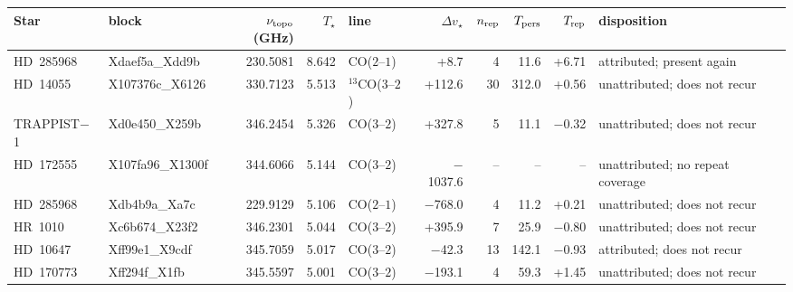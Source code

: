 \begin{tabular}{@{}l@{~}l@{~}r@{~}r@{~}l@{~}r@{~~}r@{~}r@{~}r@{~}l@{}}
\hline
Star & block & $\nu_{\rm topo}$ (GHz) & $T_\star$ & line & $\Delta v_\star$ & $n_{\rm rep}$ & $T_{\rm pers}$ & $T_{\rm rep}$ & disposition \\
\hline
HD~285968 & Xdaef5a\_Xdd9b & 230.5081 & 8.642 & CO($2$--$1$) & +8.7 & 4 & 11.6 & +6.71 & attributed; present again \\
HD~14055 & X107376c\_X6126 & 330.7123 & 5.513 & $^{13}$CO($3$--$2$) & +112.6 & 30 & 312.0 & +0.56 & unattributed; does not recur \\
TRAPPIST$-$1 & Xd0e450\_X259b & 346.2454 & 5.326 & CO($3$--$2$) & +327.8 & 5 & 11.1 & \ensuremath{-}0.32 & unattributed; does not recur \\
HD~172555 & X107fa96\_X1300f & 344.6066 & 5.144 & CO($3$--$2$) & \ensuremath{-}1037.6 & -- & -- & -- & unattributed; no repeat coverage \\
HD~285968 & Xdb4b9a\_Xa7c & 229.9129 & 5.106 & CO($2$--$1$) & \ensuremath{-}768.0 & 4 & 11.2 & +0.21 & unattributed; does not recur \\
HR~1010 & Xc6b674\_X23f2 & 346.2301 & 5.044 & CO($3$--$2$) & +395.9 & 7 & 25.9 & \ensuremath{-}0.80 & unattributed; does not recur \\
HD~10647 & Xff99e1\_X9cdf & 345.7059 & 5.017 & CO($3$--$2$) & \ensuremath{-}42.3 & 13 & 142.1 & \ensuremath{-}0.93 & attributed; does not recur \\
HD~170773 & Xff294f\_X1fb & 345.5597 & 5.001 & CO($3$--$2$) & \ensuremath{-}193.1 & 4 & 59.3 & +1.45 & unattributed; does not recur \\
\hline
\end{tabular}
